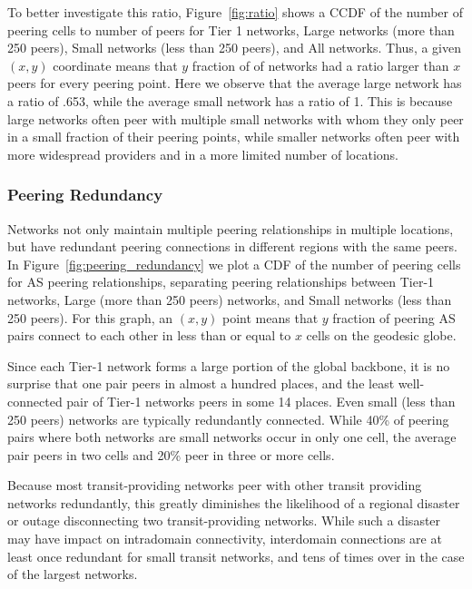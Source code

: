     To better investigate this ratio, Figure~\ref{fig:ratio} shows a CCDF of the number of peering cells to number of peers for Tier 1 networks, Large networks (more than 250 peers), Small networks (less than 250 peers), and All networks. 
    Thus, a given $(x,y)$ coordinate means that $y$ fraction of of networks had a ratio larger than $x$ peers for every peering point.
    Here we observe that the average large network has a ratio of .653, while the average small network has a ratio of 1.
    This is because large networks often peer with multiple small networks with whom they only peer in a small fraction of their peering points, while smaller networks often peer with more widespread providers and in a more limited number of locations.

\subsubsection*{Peering Redundancy}
    Networks not only maintain multiple peering relationships in multiple locations, but have redundant peering connections in different regions with the same peers.
    In Figure~\ref{fig:peering_redundancy} we plot a CDF of the number of peering cells for AS peering relationships, separating peering relationships between Tier-1 networks, Large (more than 250 peers) networks, and Small networks (less than 250 peers).
    For this graph, an $(x,y)$ point means that $y$ fraction of peering AS pairs connect to each other in less than or equal to $x$ cells on the geodesic globe.

    Since each Tier-1 network forms a large portion of the global backbone, it is no surprise that one pair peers in almost a hundred places, and the least well-connected pair of Tier-1 networks peers in some 14 places.
    Even small (less than 250 peers) networks are typically redundantly connected. 
    While 40\% of peering pairs where both networks are small networks occur in only one cell, the average pair peers in two cells and 20\% peer in three or more cells. 

    Because most transit-providing networks peer with other transit providing networks redundantly, this greatly diminishes the likelihood of a regional disaster or outage disconnecting two transit-providing networks.
    While such a disaster may have impact on intradomain connectivity, interdomain connections are at least once redundant for small transit networks, and tens of times over in the case of the largest networks.

